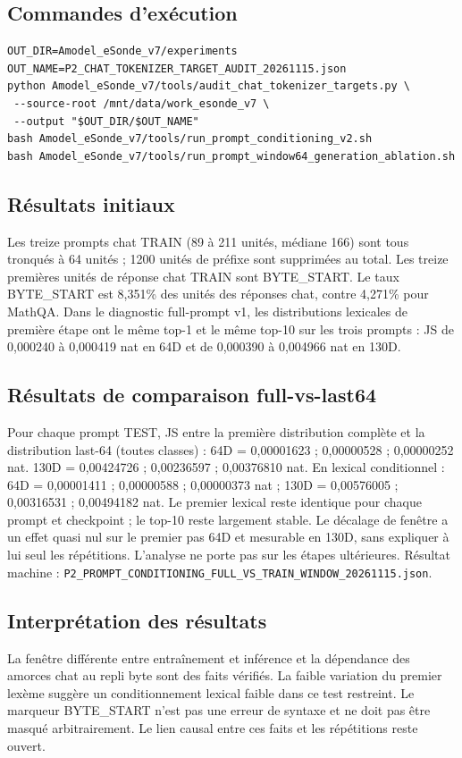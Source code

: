 \documentclass[11pt,a4paper]{report}
\begin{document}
\subsection*{Commandes d'exécution}
\begin{verbatim}
OUT_DIR=Amodel_eSonde_v7/experiments
OUT_NAME=P2_CHAT_TOKENIZER_TARGET_AUDIT_20261115.json
python Amodel_eSonde_v7/tools/audit_chat_tokenizer_targets.py \
 --source-root /mnt/data/work_esonde_v7 \
 --output "$OUT_DIR/$OUT_NAME"
bash Amodel_eSonde_v7/tools/run_prompt_conditioning_v2.sh
bash Amodel_eSonde_v7/tools/run_prompt_window64_generation_ablation.sh
\end{verbatim}
\subsection*{Résultats initiaux}
Les treize prompts chat TRAIN (89 à 211 unités, médiane 166) sont tous tronqués à 64 unités ; 1200 unités de préfixe sont supprimées au total. Les treize premières unités de réponse chat TRAIN sont BYTE\_START. Le taux BYTE\_START est 8,351\% des unités des réponses chat, contre 4,271\% pour MathQA. Dans le diagnostic full-prompt v1, les distributions lexicales de première étape ont le même top-1 et le même top-10 sur les trois prompts : JS de 0,000240 à 0,000419 nat en 64D et de 0,000390 à 0,004966 nat en 130D.
\subsection*{Résultats de comparaison full-vs-last64}
Pour chaque prompt TEST, JS entre la première distribution complète et la distribution last-64 (toutes classes) : 64D = 0,00001623 ; 0,00000528 ; 0,00000252 nat. 130D = 0,00424726 ; 0,00236597 ; 0,00376810 nat. En lexical conditionnel : 64D = 0,00001411 ; 0,00000588 ; 0,00000373 nat ; 130D = 0,00576005 ; 0,00316531 ; 0,00494182 nat. Le premier lexical reste identique pour chaque prompt et checkpoint ; le top-10 reste largement stable. Le décalage de fenêtre a un effet quasi nul sur le premier pas 64D et mesurable en 130D, sans expliquer à lui seul les répétitions. L’analyse ne porte pas sur les étapes ultérieures. Résultat machine : \texttt{P2\_PROMPT\_CONDITIONING\_FULL\_VS\_TRAIN\_WINDOW\_20261115.json}.
\subsection*{Interprétation des résultats}
La fenêtre différente entre entraînement et inférence et la dépendance des amorces chat au repli byte sont des faits vérifiés. La faible variation du premier lexème suggère un conditionnement lexical faible dans ce test restreint. Le marqueur BYTE\_START n'est pas une erreur de syntaxe et ne doit pas être masqué arbitrairement. Le lien causal entre ces faits et les répétitions reste ouvert.
\end{document}
